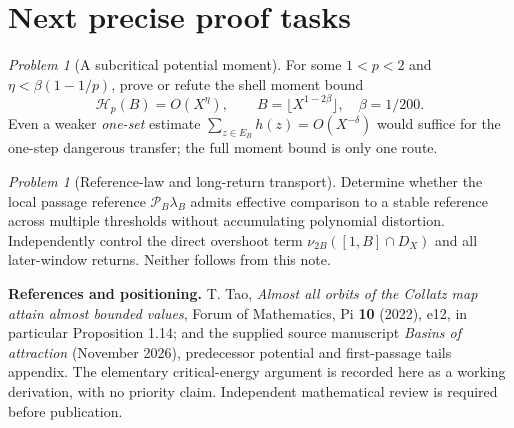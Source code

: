 \documentclass[10pt]{amsart}
\theoremstyle{definition}\newtheorem{definition}[theorem]{Definition}
\theoremstyle{remark}\newtheorem{remark}[theorem]{Remark}
\newtheorem{problem}[theorem]{Problem}
\newcommand{\cP}{\mathcal P}
\begin{document}
\section{Next precise proof tasks}
\begin{problem}[A subcritical potential moment]
For some $1<p<2$ and $\eta<\beta(1-1/p)$, prove or refute the shell moment bound
\[
 \mathcal H_p(B)=O(X^\eta),\qquad B=\lfloor X^{1-2\beta}\rfloor,\quad\beta=1/200.
\]
Even a weaker \emph{one-set} estimate $\sum_{z\in E_B}h(z)=O(X^{-\delta})$ would suffice for the one-step dangerous transfer; the full moment bound is only one route.
\end{problem}
\begin{problem}[Reference-law and long-return transport]
Determine whether the local passage reference $\cP_B\lambda_B$ admits effective comparison to a stable reference across multiple thresholds without accumulating polynomial distortion. Independently control the direct overshoot term $\nu_{2B}([1,B]\cap D_X)$ and all later-window returns. Neither follows from this note.
\end{problem}

\noindent\textbf{References and positioning.} T. Tao, \emph{Almost all orbits of the Collatz map attain almost bounded values}, Forum of Mathematics, Pi \textbf{10} (2022), e12, in particular Proposition 1.14; and the supplied source manuscript \emph{Basins of attraction} (November 2026), predecessor potential and first-passage tails appendix. The elementary critical-energy argument is recorded here as a working derivation, with no priority claim. Independent mathematical review is required before publication.
\end{document}
